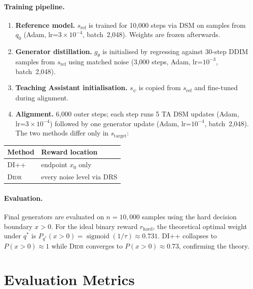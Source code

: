 \paragraph{Training pipeline.}
\begin{enumerate}[1.]
    \item \textbf{Reference model.} $s_{\mathrm{ref}}$ is trained for 10{,}000 steps via DSM on samples from $q_0$ (Adam, lr=$3\times10^{-4}$, batch~2{,}048). Weights are frozen afterwards.
    \item \textbf{Generator distillation.} $g_\theta$ is initialised by regressing against 30-step DDIM samples from $s_{\mathrm{ref}}$ using matched noise (3{,}000 steps, Adam, lr=$10^{-3}$, batch~2{,}048).
    \item \textbf{Teaching Assistant initialisation.} $s_\psi$ is copied from $s_{\mathrm{ref}}$ and fine-tuned during alignment.
    \item \textbf{Alignment.} 6{,}000 outer steps; each step runs 5 TA DSM updates (Adam, lr=$3\times10^{-4}$) followed by one generator update (Adam, lr=$10^{-4}$, batch~2{,}048). The two methods differ only in $s_{\mathrm{target}}$:
\end{enumerate}

\begin{center}
\begin{tabular}{ll}
\toprule
Method & Reward location \\
\midrule
DI++ & endpoint $x_0$ only \\
\textsc{Didr} & every noise level via DRS \\
\bottomrule
\end{tabular}
\end{center}

\paragraph{Evaluation.}
Final generators are evaluated on $n=10{,}000$ samples using the hard decision boundary $x>0$. For the ideal binary reward $r_{\mathrm{hard}}$, the theoretical optimal weight under $q^*$ is $P_{q^*}(x>0)=\operatorname{sigmoid}(1/\tau)\approx0.731$.
DI++ collapses to $P(x>0)\approx1$ while \textsc{Didr} converges to $P(x>0)\approx0.73$, confirming the theory.

\section{Evaluation Metrics}
\label{app:evaluation_metrics}

